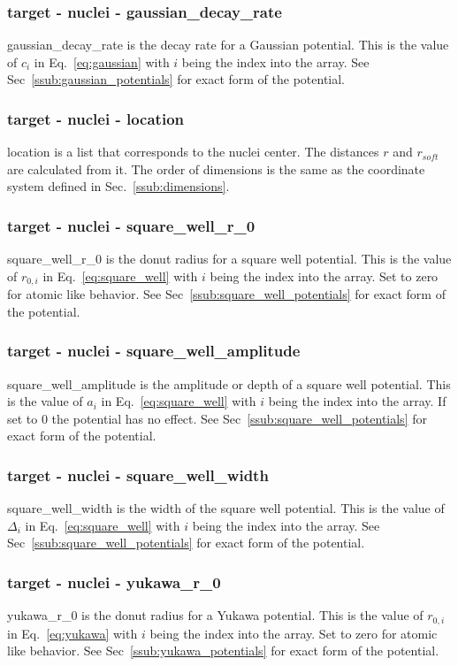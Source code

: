\documentclass{article}
\begin{document}
\subsubsection{target - nuclei - gaussian\_decay\_rate}
gaussian\_decay\_rate is the decay rate for a Gaussian potential. This is the value of $c_i$ in Eq.~\ref{eq:gaussian} with $i$ being the index into the array. See Sec~\ref{ssub:gaussian_potentials} for exact form of the potential.

\subsubsection{target - nuclei - location}
location is a list that corresponds to the nuclei center. The distances $r$ and $r_{soft}$ are calculated from it. The order of dimensions is the same as the coordinate system defined in Sec.~\ref{ssub:dimensions}.

\subsubsection{target - nuclei - square\_well\_r\_0}
square\_well\_r\_0 is the donut radius for a square well potential. This is the value of $r_{0,i}$ in Eq.~\ref{eq:square_well} with $i$ being the index into the array. Set to zero for atomic like behavior. See Sec~\ref{ssub:square_well_potentials} for exact form of the potential.

\subsubsection{target - nuclei - square\_well\_amplitude}
square\_well\_amplitude is the amplitude or depth of a square well potential. This is the value of $a_i$ in Eq.~\ref{eq:square_well} with $i$ being the index into the array. If set to 0 the potential has no effect. See Sec~\ref{ssub:square_well_potentials} for exact form of the potential.

\subsubsection{target - nuclei - square\_well\_width}
square\_well\_width is the width of the square well potential. This is the value of $\Delta_i$ in Eq.~\ref{eq:square_well} with $i$ being the index into the array. See Sec~\ref{ssub:square_well_potentials} for exact form of the potential.

\subsubsection{target - nuclei - yukawa\_r\_0}
yukawa\_r\_0 is the donut radius for a Yukawa potential. This is the value of $r_{0,i}$ in Eq.~\ref{eq:yukawa} with $i$ being the index into the array. Set to zero for atomic like behavior. See Sec~\ref{ssub:yukawa_potentials} for exact form of the potential.
\end{document}
